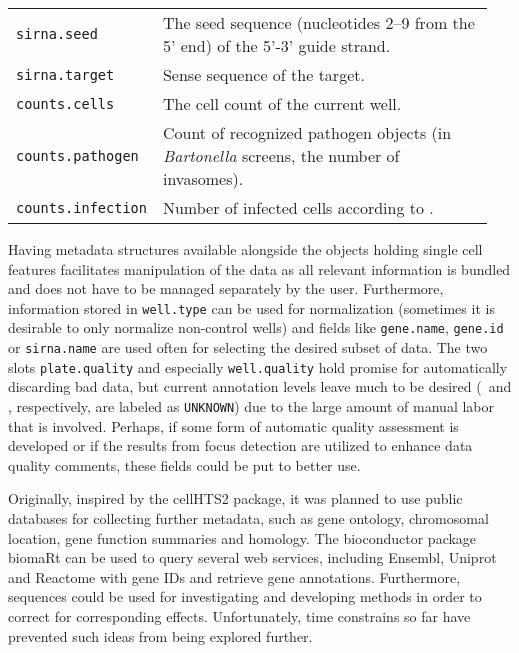 \begin{table}
\begin{tabular}{L{0.25\linewidth}L{0.7\linewidth}}
    \texttt{sirna.seed} &
      The seed sequence (nucleotides 2--9 from the 5' end) of the 5'-3'  guide strand. \\
    \texttt{sirna.target} &
      Sense sequence of the  target. \\
    \texttt{counts.cells} &
      The cell count of the current well. \\
    \texttt{counts.pathogen} &
      Count of recognized pathogen objects (in \textit{Bartonella} screens, the number of invasomes). \\
    \texttt{counts.infection} &
      Number of infected cells according to . \\
    \hline 
  \end{tabular}
\end{table}

Having metadata structures available alongside the objects holding single cell features facilitates manipulation of the data as all relevant information is bundled and does not have to be managed separately by the user. Furthermore, information stored in \texttt{well.type} can be used for normalization (sometimes it is desirable to only normalize non-control wells) and fields like \texttt{gene.name}, \texttt{gene.id} or \texttt{sirna.name} are used often for selecting the desired subset of data. The two slots \texttt{plate.quality} and especially \texttt{well.quality} hold promise for automatically discarding bad data, but current annotation levels leave much to be desired (\knitrScfMetadatPlateQualityFrac\ and \knitrScfMetadatWellQualityFrac, respectively, are labeled as \texttt{UNKNOWN}) due to the large amount of manual labor that is involved. Perhaps, if some form of automatic quality assessment is developed or if the results from focus detection are utilized to enhance data quality comments, these fields could be put to better use.

Originally, inspired by the cellHTS2 package, it was planned to use public databases for collecting further metadata, such as gene ontology, chromosomal location, gene function summaries and homology. The bioconductor package biomaRt \citep{Durinck2005,Durinck2009} can be used to query several web services, including Ensembl, Uniprot and Reactome with gene IDs \citep{Maglott2011} and retrieve gene annotations. Furthermore,  sequences could be used for investigating  and developing methods in order to correct for corresponding effects. Unfortunately, time constrains so far have prevented such ideas from being explored further.

